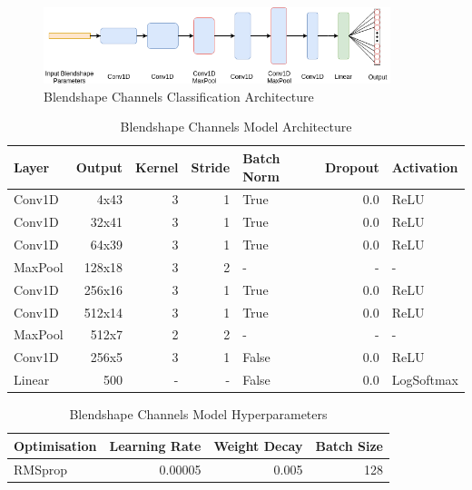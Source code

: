 \begin{figure}[h!]
    \centering
        \includegraphics[width=0.9\textwidth]{figures/classification/blendshape_channel_arch.png}
    \caption{Blendshape Channels Classification Architecture}
\end{figure} \label{fig:Blendshape_Channel_Classifier}
\quad

\begin{table}[h!]
\centering
    \begin{tabular}{ l | r | r | r | l | r | l}
    \textbf{Layer} & \textbf{Output} & \textbf{Kernel} & \textbf{Stride} & \textbf{Batch Norm} & \textbf{Dropout} & \textbf{Activation} \\ \hline
    Conv1D & 4x43 & 3 & 1 & True & 0.0 & ReLU \\ \hline
    Conv1D & 32x41 & 3 & 1 & True & 0.0 & ReLU \\ \hline
    Conv1D & 64x39 & 3 & 1 & True & 0.0 & ReLU \\ \hline
    MaxPool & 128x18 & 3 & 2 & - & - & - \\ \hline
    Conv1D & 256x16 & 3 & 1 & True & 0.0 & ReLU \\ \hline
    Conv1D & 512x14 & 3 & 1 & True & 0.0 & ReLU \\ \hline
    MaxPool & 512x7 & 2 & 2 & - & - & - \\ \hline
    Conv1D & 256x5 & 3 & 1 & False & 0.0 & ReLU \\ \hline
    Linear & 500 & - & - & False & 0.0 & LogSoftmax \\
    \end{tabular} 
    \caption{Blendshape Channels Model Architecture}
\end{table}\label{table:blendshape_channels_classifier}
\quad

\begin{table}[h!]
\centering
    \begin{tabular}{l | r | r | r}
    \textbf{Optimisation} & \textbf{Learning Rate} & \textbf{Weight Decay} & \textbf{Batch Size} \\
    \hline
    RMSprop & 0.00005 & 0.005 & 128 \\
    \end{tabular} 
    \caption{Blendshape Channels Model Hyperparameters}
\end{table}\label{table:blendshape_channels_classifier_hyperparameters}

